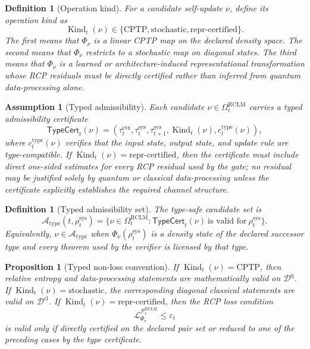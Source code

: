 \documentclass[11pt,a4paper]{article}
\newtheorem{proposition}[theorem]{Proposition}
\newtheorem{definition}[theorem]{Definition}
\newtheorem{assumption}[theorem]{Assumption}
\newcommand{\D}{\mathcal D}
\newcommand{\Lcal}{\mathcal L}
\newcommand{\Pcal}{\mathcal P}
\newcommand{\Acal}{\mathcal A}
\newcommand{\eps}{\varepsilon}
\newcommand{\RCLM}{\mathrm{RCLM}}
\newcommand{\sys}{\mathrm{sys}}
\newcommand{\ctx}{\mathrm{ctx}}
\newcommand{\qtype}{\mathrm{q}}
\newcommand{\cltype}{\mathrm{cl}}
\begin{document}
\begin{definition}[Operation kind]
For a candidate self-update \(\nu\), define its operation kind as
\[
\operatorname{Kind}_t(\nu)\in\{\mathrm{CPTP},\mathrm{stochastic},\mathrm{repr\mbox{-}certified}\}.
\]
The first means that \(\Phi_\nu\) is a linear CPTP map on the declared density space. The second means that \(\Phi_\nu\) restricts to a stochastic map on diagonal states. The third means that \(\Phi_\nu\) is a learned or architecture-induced representational transformation whose RCP residuals must be directly certified rather than inferred from quantum data-processing alone.
\end{definition}

\begin{assumption}[Typed admissibility]
Each candidate \(\nu\in\Omega_t^{\RCLM}\) carries a typed admissibility certificate
\[
\mathsf{TypeCert}_t(\nu)=
(\tau_t^{\ctx},\tau_t^{\sys},\tau_{t+1}^{\sys},\operatorname{Kind}_t(\nu),c_t^{\mathrm{type}}(\nu)),
\]
where \(c_t^{\mathrm{type}}(\nu)\) verifies that the input state, output state, and update rule are type-compatible. If \(\operatorname{Kind}_t(\nu)=\mathrm{repr\mbox{-}certified}\), then the certificate must include direct one-sided estimates for every RCP residual used by the gate; no residual may be justified solely by quantum or classical data-processing unless the certificate explicitly establishes the required channel structure.
\end{assumption}

\begin{definition}[Typed admissibility set]
The type-safe candidate set is
\[
\Acal_{\mathrm{type}}(t,\rho_t^{\sys})
=
\{\nu\in\Omega_t^{\RCLM}:\mathsf{TypeCert}_t(\nu)\ \text{is valid for}\ \rho_t^{\sys}\}.
\]
Equivalently, \(\nu\in\Acal_{\mathrm{type}}\) when \(\Phi_\nu(\rho_t^{\sys})\) is a density state of the declared successor type and every theorem used by the verifier is licensed by that type.
\end{definition}

\begin{proposition}[Typed non-loss convention]
\label{prop:typed-non-loss-convention}
If \(\operatorname{Kind}_t(\nu)=\mathrm{CPTP}\), then relative entropy and data-processing statements are mathematically valid on \(\D^{\qtype}\). If \(\operatorname{Kind}_t(\nu)=\mathrm{stochastic}\), the corresponding diagonal classical statements are valid on \(\D^{\cltype}\). If \(\operatorname{Kind}_t(\nu)=\mathrm{repr\mbox{-}certified}\), then the RCP loss condition
\[
\Lcal^{\Pcal_t^{\RCLM}}_{\Phi_\nu}\le\eps_t
\]
is valid only if directly certified on the declared pair set or reduced to one of the preceding cases by the type certificate.
\end{proposition}
\end{document}

